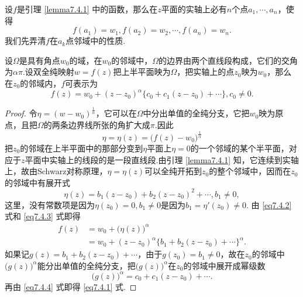 设$f$是引理 \ref{lemma7.4.1} 中的函数，那么在$z$平面的实轴上必有$n$个点$a_1,\cdots,a_n$，使得
\[
  f(a_1) = w_1,f(a_2) = w_2,\cdots,f(a_n) = w_n.
\]
我们先弄清$f$在$a_k$点邻域中的性质.

\begin{lemma}\label{lemma7.4.2}
  设$\Omega$是具有角点$w_0$的域，在$w_0$的邻域中，$\Omega$的边界由两个直线段构成，它们的交角为$\alpha\pi$.设双全纯映射$w=f(z)$把上半平面映为$\Omega$，把实轴上的点$z_0$映为$w_0$，那么在$z_0$的邻域内，$f$可表示为
  \begin{equation}\label{eq7.4.1}
    f(z) = w_0 + (z-z_0)^\alpha\{c_0 + c_1(z-z_0) + \cdots\},c_0\ne0.
  \end{equation}
\end{lemma}
\begin{proof}
  令$\eta=(w-w_0)^{\frac1\alpha}$，它可以在$\Omega$中分出单值的全纯分支，它把$w_0$映为原点，且把$\Omega$的两条边界线所张的角扩大成$\pi$.因此
  \begin{equation}\label{eq7.4.2}
    \eta = \eta(z) = \big(f(z)-w_0\big)^{\frac1\alpha}
  \end{equation}
  把$z_0$的邻域在上半平面中的那部分变到$\eta$平面上$\eta=0$的一个邻域的某个半平面，对应于$z$平面中实轴上的线段的是一段直线段.由引理 \ref{lemma7.4.1} 知，它连续到实轴上，故由Schwarz对称原理，$\eta=\eta(z)$可以全纯开拓到$z_0$的整个邻域中，因而在$z_0$的邻域中有展开式
  \begin{equation}\label{eq7.4.3}
    \eta(z) = b_1(z-z_0) + b_2(z-z_0)^2 + \cdots,b_1\ne0,
  \end{equation}
  这里，没有常数项是因为$\eta(z_0)=0,b_1\ne0$是因为$b_1=\eta'(z_0)\ne0$. 由 \eqref{eq7.4.2} 式和 \eqref{eq7.4.3} 式即得
  \begin{equation}\label{eq7.4.4}
    \begin{aligned}
      f(z) & = w_0 + \big(\eta(z)\big)^\alpha\\
      & = w_0 + (z-z_0)^\alpha\{b_1+b_2(z-z_0)+\cdots\}^\alpha.
    \end{aligned}
  \end{equation}
  如果记$g(z)=b_1+b_2(z-z_0)+\cdots$，由于$g(z_0)=b_1\ne0$，故在$z_0$的邻域中$\big(g(z)\big)^\alpha$能分出单值的全纯分支，把$\big(g(z)\big)^\alpha$在$z_0$的邻域中展开成幂级数
  \[
    \big(g(z)\big)^\alpha = c_0 + c_1(z-z_0) + \cdots.
  \]
  再由 \eqref{eq7.4.4} 式即得 \eqref{eq7.4.1} 式.
\end{proof}

